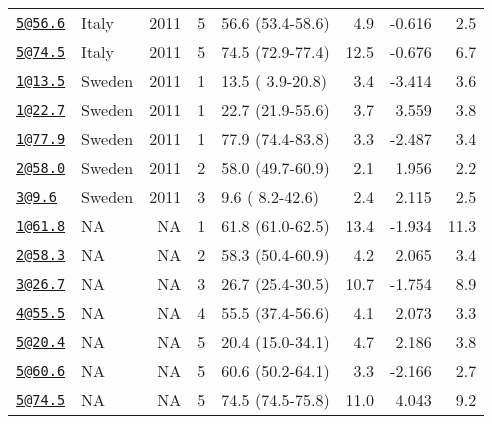 \documentclass[]{article}
\begin{document}
\begin{longtable}[]{@{}llrrlrrr@{}}
\href{mailto:5@56.6}{\nolinkurl{5@56.6}} & Italy & 2011 & 5 & 56.6 (53.4-58.6) & 4.9 & -0.616 & 2.5\tabularnewline
\href{mailto:5@74.5}{\nolinkurl{5@74.5}} & Italy & 2011 & 5 & 74.5 (72.9-77.4) & 12.5 & -0.676 & 6.7\tabularnewline
\href{mailto:1@13.5}{\nolinkurl{1@13.5}} & Sweden & 2011 & 1 & 13.5 ( 3.9-20.8) & 3.4 & -3.414 & 3.6\tabularnewline
\href{mailto:1@22.7}{\nolinkurl{1@22.7}} & Sweden & 2011 & 1 & 22.7 (21.9-55.6) & 3.7 & 3.559 & 3.8\tabularnewline
\href{mailto:1@77.9}{\nolinkurl{1@77.9}} & Sweden & 2011 & 1 & 77.9 (74.4-83.8) & 3.3 & -2.487 & 3.4\tabularnewline
\href{mailto:2@58.0}{\nolinkurl{2@58.0}} & Sweden & 2011 & 2 & 58.0 (49.7-60.9) & 2.1 & 1.956 & 2.2\tabularnewline
\href{mailto:3@9.6}{\nolinkurl{3@9.6}} & Sweden & 2011 & 3 & 9.6 ( 8.2-42.6) & 2.4 & 2.115 & 2.5\tabularnewline
\href{mailto:1@61.8}{\nolinkurl{1@61.8}} & NA & NA & 1 & 61.8 (61.0-62.5) & 13.4 & -1.934 & 11.3\tabularnewline
\href{mailto:2@58.3}{\nolinkurl{2@58.3}} & NA & NA & 2 & 58.3 (50.4-60.9) & 4.2 & 2.065 & 3.4\tabularnewline
\href{mailto:3@26.7}{\nolinkurl{3@26.7}} & NA & NA & 3 & 26.7 (25.4-30.5) & 10.7 & -1.754 & 8.9\tabularnewline
\href{mailto:4@55.5}{\nolinkurl{4@55.5}} & NA & NA & 4 & 55.5 (37.4-56.6) & 4.1 & 2.073 & 3.3\tabularnewline
\href{mailto:5@20.4}{\nolinkurl{5@20.4}} & NA & NA & 5 & 20.4 (15.0-34.1) & 4.7 & 2.186 & 3.8\tabularnewline
\href{mailto:5@60.6}{\nolinkurl{5@60.6}} & NA & NA & 5 & 60.6 (50.2-64.1) & 3.3 & -2.166 & 2.7\tabularnewline
\href{mailto:5@74.5}{\nolinkurl{5@74.5}} & NA & NA & 5 & 74.5 (74.5-75.8) & 11.0 & 4.043 & 9.2\tabularnewline
\bottomrule
\end{longtable}

\newpage
\end{document}
